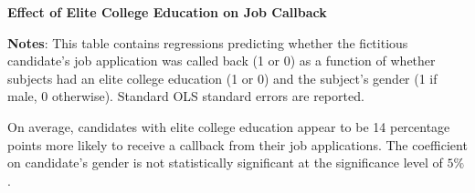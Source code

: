 \documentclass[11pt]{article}
\begin{document}
\begin{table}[htbp]
\caption{\textbf{Effect of Elite College Education on Job Callback}
\label{tab:EngApproach}}
\flushleft
	
    \flushleft
    \begin{footnotesize}
    \textbf{Notes}: This table contains regressions predicting whether the fictitious candidate's job application was called back (1 or 0) as a function of whether subjects had an elite college education (1 or 0) and the subject's gender (1 if male, 0 otherwise). Standard OLS standard errors are reported.  
    \end{footnotesize}
\end{table}

On average, candidates with elite college education appear to be 14 percentage points more likely to receive a callback from their job applications. The coefficient on candidate's gender is not statistically significant at the significance level of $5\%$.
\end{document}

